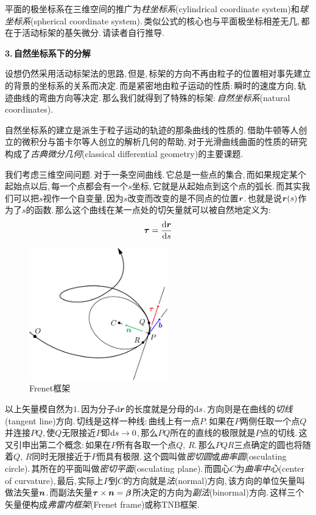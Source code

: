 平面的极坐标系在三维空间的推广为\emph{柱坐标系}(cylindrical coordinate system)和\emph{球坐标系}(spherical coordinate system).\,类似公式的核心也与平面极坐标相差无几,\,都在于活动标架的基矢微分.\,请读者自行推导.

\vspace{0.2cm}
{\bf 3.\,自然坐标系下的分解}

设想仍然采用活动标架法的思路,\,但是,\,标架的方向不再由粒子的位置相对事先建立的背景的坐标系的关系而决定.\,而是紧密地由粒子运动的性质:\,瞬时的速度方向,\,轨迹曲线的弯曲方向等决定.\,那么我们就得到了特殊的标架:\,\emph{自然坐标系}(natural coordinates).

自然坐标系的建立是派生于粒子运动的轨迹的那条曲线的性质的.\,借助牛顿等人创立的微积分与笛卡尔等人创立的解析几何的帮助,\,对于光滑曲线曲面的性质的研究构成了\emph{古典微分几何}(classical differential geometry)的主要课题.\,

我们考虑三维空间问题.\,对于一条空间曲线.\,它总是一些点的集合,\,而如果规定某个起始点以后,\,每一个点都会有一个$s$坐标,\,它就是从起始点到这个点的弧长.\,而其实我们可以把$s$视作一个自变量,\,因为$s$改变而改变的是不同点的位置$\boldsymbol{r}$.\,也就是说$\boldsymbol{r}(s)$作为了$s$的函数.\,那么这个曲线在某一点处的切矢量就可以被自然地定义为:
\[\boldsymbol{\tau}=\frac{\textrm{d} \boldsymbol{r}}{\textrm{d} s}\]

\begin{figure}\label{6-1-7}
\vspace{-0.2cm}
\centering
\includegraphics[width=6cm]{image/6-1-7.png}
\caption{Frenet框架}
\end{figure}
以上矢量模自然为$1$.\,因为分子$\textrm{d} \boldsymbol{r}$的长度就是分母的$\textrm{d} s$.\,方向则是在曲线的\emph{切线}(tangent line)方向.\,切线是这样一种线:\,曲线上有一点$P$.\,如果在$P$两侧任取一个点$Q$并连接$PQ$,\,使$Q$无限接近$P$即$\textrm{d} s \to 0$,\,那么$PQ$所在的直线的极限就是$P$点的切线.\,这又引申出第二个概念:\,如果在$P$所有各取一个点$Q,\,R$.\,那么$PQR$三点确定的圆也将随着$Q,\,R$同时无限接近于$P$而具有极限.\,这个圆叫做\emph{密切圆}或\emph{曲率圆}(osculating circle).\,其所在的平面叫做\emph{密切平面}(osculating plane).\,而圆心$C$为\emph{曲率中心}(center of curvature),\,最后,\,实际上$P$到$C$的方向就是\emph{法}(normal)方向,\,该方向的单位矢量叫做法矢量$\boldsymbol{n}$.\,而副法矢量$\boldsymbol{\tau}\times\boldsymbol{n}=\boldsymbol{\beta}$所决定的方向为\emph{副法}(binormal)方向.\,这样三个矢量便构成\emph{弗雷内框架}(Frenet frame)或称TNB框架.

